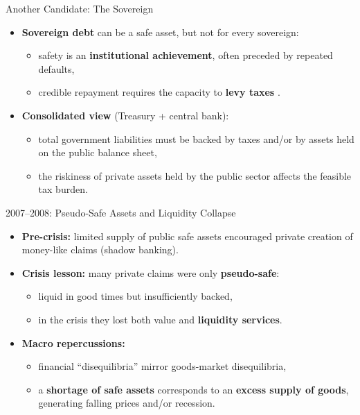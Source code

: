 \documentclass[11pt,aspectratio=169]{beamer}
\begin{document}
\begin{frame}{Another Candidate: The Sovereign}
\small
\begin{itemize}
  \item \textbf{Sovereign debt} can be a safe asset, but not for every sovereign:
  \begin{itemize}
    \item safety is an \textbf{institutional achievement}, often preceded by repeated defaults,
    \item credible repayment requires the capacity to \textbf{levy taxes} \parencite{hamilton1947,gorton2017}.
  \end{itemize}
  \vspace{0.45em}
  \item \textbf{Consolidated view} (Treasury + central bank):
  \begin{itemize}
    \item total government liabilities must be backed by taxes and/or by assets held on the public balance sheet,
    \item the riskiness of private assets held by the public sector affects the feasible tax burden.
  \end{itemize}
\end{itemize}
\end{frame}

\begin{frame}{2007--2008: Pseudo-Safe Assets and Liquidity Collapse}
\small
\begin{itemize}
  \item \textbf{Pre-crisis:} limited supply of public safe assets encouraged private creation of money-like claims (shadow banking).
  \vspace{0.35em}
  \item \textbf{Crisis lesson:} many private claims were only \textbf{pseudo-safe}:
  \begin{itemize}
    \item liquid in good times but insufficiently backed,
    \item in the crisis they lost both value and \textbf{liquidity services}.
  \end{itemize}
  \vspace{0.35em}
  \item \textbf{Macro repercussions:}
  \begin{itemize}
    \item financial ``disequilibria'' mirror goods-market disequilibria,
    \item a \textbf{shortage of safe assets} corresponds to an \textbf{excess supply of goods}, generating falling prices and/or recession.
  \end{itemize}
\end{itemize}
\end{frame}
\end{document}
